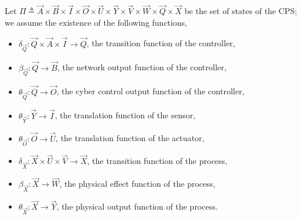 {
\begin{definition}
\label{def:CPSRobustness:SingleCycleSemantics}
Let $\Pi\triangleq \vec{A}\times\vec{B}\times\vec{I}\times\vec{O}\times\vec{U}\times\vec{Y}\times\vec{V}\times\vec{W}\times\vec{Q}\times\vec{X}$ be the set of states of the CPS; we assume the existence of the following functions,
\begin{itemize}
\item $\delta_{\vec{Q}}\colon \vec{Q}\times \vec{A}\times \vec{I} \rightarrow \vec{Q}$, the transition function of the controller,
\item $\beta_{\vec{Q}}\colon \vec{Q}\rightarrow \vec{B}$, the network output function of the controller,
\item $\theta_{\vec{Q}}\colon \vec{Q}\rightarrow \vec{O}$, the cyber control output function of the controller,
\item $\theta_{\vec{Y}}\colon \vec{Y} \rightarrow \vec{I}$, the translation function of the sensor,
\item $\theta_{\vec{O}}\colon \vec{O} \rightarrow \vec{U}$, the translation function of the actuator,
\item $\delta_{\vec{X}}\colon \vec{X} \times \vec{U}\times \vec{V} \rightarrow \vec{X}$, the transition function of the process,
\item $\beta_{\vec{X}}\colon \vec{X}\rightarrow \vec{W}$, the physical effect function of the process,
\item $\theta_{\vec{X}}\colon \vec{X}\rightarrow \vec{Y}$, the physical output function of the process.
\end{itemize} 


\end{definition}}
